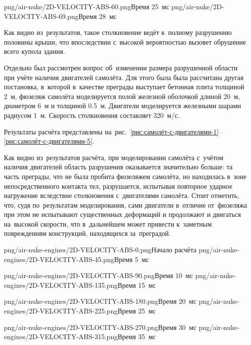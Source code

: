 \documentclass[thesis.tex]{subfiles}
\begin{document}
        {png/air-nuke/2D-VELOCITY-ABS-60.png}{Время 25~мс}
        {png/air-nuke/2D-VELOCITY-ABS-69.png}{Время 28~мс}


Как видно из~результатов, такое столкновение ведёт к~полному разрушению половины крыши, что впоследствии с~высокой
вероятностью вызовет обрушение всего купола здания.

Отдельно был рассмотрен вопрос об~изменении размера разрушенной области при учёте наличия двигателей самолёта.
Для этого была была рассчитана другая постановка, в~которой в~качестве преграды выступает бетонная плита толщиной 2~м,
фюзеляж самолёта моделируется полой железной оболочкой длиной 20~м, диаметром 6~м и толщиной 0.5~м. Двигатели
моделируется железными шарами радиусом 1~м. Скорость столкновения составляет 320~м/с.

Результаты расчёта представлены на~рис.~\ref{рис:самолёт-с-двигателями-1}--\ref{рис:самолёт-с-двигателями-5}.

Как видно из~результатов расчёта, при моделировании самолёта с~учётом наличия двигателей область разрушения оказывается
значительно больше: та часть преграды, что не была пробита фюзеляжем самолёта,  но находилась в~зоне непосредственного
контакта тел, разрушается, испытывая повторное ударное нагружение вследствие столкновения с~двигателями самолёта. Стоит
отметить, что, судя по~результатам моделирования, сами двигатели в~отличие от~фюзеляжа при этом не испытывают
существенных деформаций и продолжают и двигаться на~высокой скорости, что в~дальнейшем может привести к~заметным
повреждениям конструкций, находящихся за~преградой.

        {png/air-nuke-engines/2D-VELOCITY-ABS-0.png}{Начало расчёта}
        {png/air-nuke-engines/2D-VELOCITY-ABS-45.png}{Время 5~мс}

        {png/air-nuke-engines/2D-VELOCITY-ABS-90.png}{Время 10~мс}
        {png/air-nuke-engines/2D-VELOCITY-ABS-135.png}{Время 15~мс}

        {png/air-nuke-engines/2D-VELOCITY-ABS-180.png}{Время 20~мс}
        {png/air-nuke-engines/2D-VELOCITY-ABS-225.png}{Время 25~мс}

        {png/air-nuke-engines/2D-VELOCITY-ABS-270.png}{Время 30~мс}
        {png/air-nuke-engines/2D-VELOCITY-ABS-315.png}{Время 35~мс}
\end{document}
